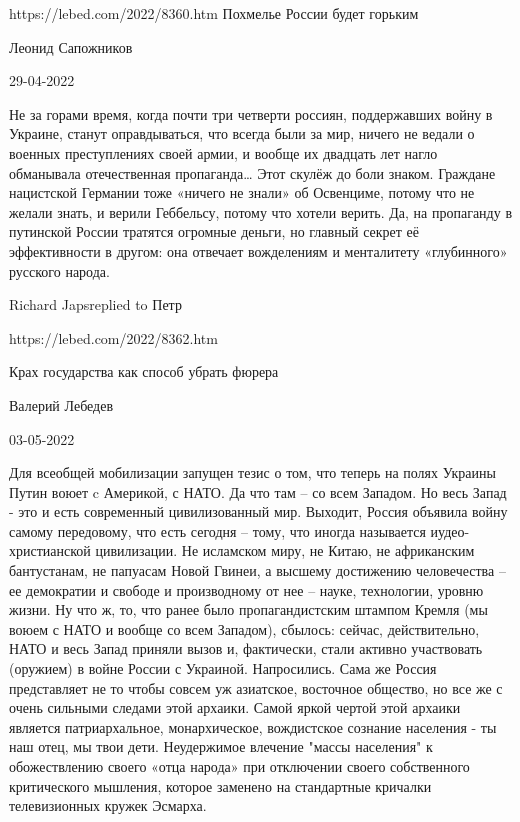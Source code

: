 







https://lebed.com/2022/8360.htm
Похмелье России будет горьким

Леонид Сапожников

29-04-2022

Не за горами время, когда почти три четверти
россиян,
поддержавших войну в Украине, станут оправдываться, что всегда
были за мир,
ничего не ведали о военных преступлениях своей армии, и вообще их
двадцать лет
нагло обманывала отечественная пропаганда… Этот скулёж до боли
знаком. Граждане
нацистской Германии тоже «ничего не знали» об Освенциме, потому
что не желали
знать, и верили Геббельсу, потому что хотели верить. Да, на
пропаганду в
путинской России тратятся огромные деньги, но главный секрет её
эффективности в
другом: она отвечает вожделениям и менталитету «глубинного»
русского
народа. 

Richard Japsreplied to Петр

https://lebed.com/2022/8362.htm

Крах государства как способ убрать фюрера

Валерий Лебедев

03-05-2022 

Для всеобщей мобилизации запущен тезис о том,
что
теперь на полях Украины Путин воюет c Америкой, с НАТО. Да что
там – со
всем Западом. Но весь Запад - это и есть современный
цивилизованный мир.
Выходит, Россия объявила войну самому передовому, что есть
сегодня –
тому, что иногда называется иудео-христианской цивилизации. Не
исламском миру,
не Китаю, не африканским бантустанам, не папуасам Новой Гвинеи, а
высшему
достижению человечества – ее демократии и свободе и производному
от нее –
науке, технологии, уровню жизни. Ну что ж, то, что ранее было
пропагандистским штампом Кремля (мы воюем с НАТО и вообще со всем
Западом),
сбылось: сейчас, действительно, НАТО и весь Запад приняли вызов и,
фактически,
стали активно участвовать (оружием) в войне России с Украиной.
Напросились.
Сама же Россия представляет не то чтобы совсем уж азиатское,
восточное
общество, но все же с очень сильными следами этой архаики. Самой
яркой
чертой этой архаики является патриархальное, монархическое,
вождистское
сознание населения - ты наш отец, мы твои дети. Неудержимое
влечение
"массы населения" к обожествлению своего «отца народа» при
отключении
своего собственного критического мышления, которое заменено на
стандартные кричалки телевизионных кружек Эсмарха.

